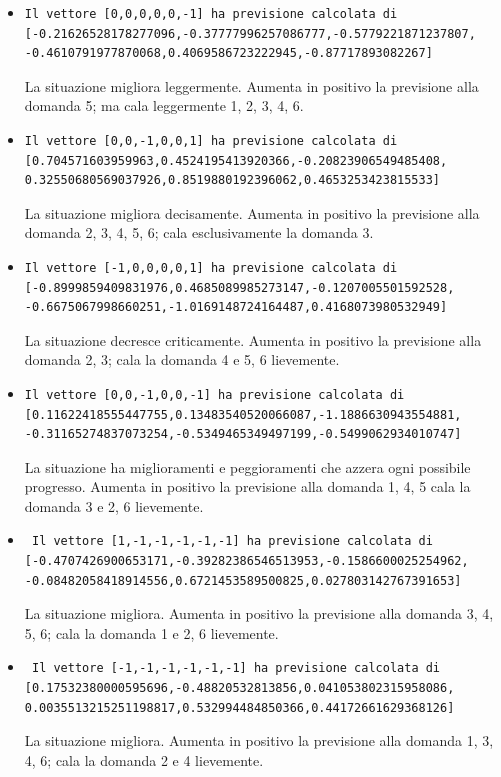 \begin{itemize}
\item \begin{verbatim}Il vettore [0,0,0,0,0,-1] ha previsione calcolata di
[-0.21626528178277096,-0.37777996257086777,-0.5779221871237807,
-0.4610791977870068,0.4069586723222945,-0.87717893082267]\end{verbatim}
La situazione migliora leggermente. Aumenta in positivo la previsione alla domanda 5; ma cala leggermente 1, 2, 3, 4, 6.

\item \begin{verbatim}Il vettore [0,0,-1,0,0,1] ha previsione calcolata di
[0.704571603959963,0.4524195413920366,-0.20823906549485408,
0.32550680569037926,0.8519880192396062,0.4653253423815533]
\end{verbatim}
La situazione migliora decisamente. Aumenta in positivo la previsione alla domanda 2, 3, 4, 5, 6;  cala esclusivamente la domanda 3.

\item \begin{verbatim}Il vettore [-1,0,0,0,0,1] ha previsione calcolata di
[-0.8999859409831976,0.4685089985273147,-0.1207005501592528,
-0.6675067998660251,-1.0169148724164487,0.4168073980532949]
\end{verbatim}
La situazione decresce criticamente. Aumenta in positivo la previsione alla domanda 2, 3; cala la domanda 4 e 5, 6 lievemente.

\item \begin{verbatim}Il vettore [0,0,-1,0,0,-1] ha previsione calcolata di
[0.11622418555447755,0.13483540520066087,-1.1886630943554881,
-0.31165274837073254,-0.5349465349497199,-0.5499062934010747]
\end{verbatim}
La situazione ha miglioramenti e peggioramenti che azzera ogni possibile progresso. Aumenta in positivo la previsione alla domanda 1, 4, 5  cala la domanda  3 e 2, 6 lievemente.

\item \begin{verbatim} Il vettore [1,-1,-1,-1,-1,-1] ha previsione calcolata di
[-0.4707426900653171,-0.39282386546513953,-0.1586600025254962,
-0.08482058418914556,0.6721453589500825,0.027803142767391653]
\end{verbatim}
La situazione migliora. Aumenta in positivo la previsione alla domanda 3, 4, 5, 6;  cala la domanda 1 e 2, 6 lievemente.

\item \begin{verbatim} Il vettore [-1,-1,-1,-1,-1,-1] ha previsione calcolata di
[0.17532380000595696,-0.48820532813856,0.041053802315958086,
0.0035513215251198817,0.532994484850366,0.44172661629368126]
\end{verbatim}
La situazione migliora. Aumenta in positivo la previsione alla domanda 1, 3, 4, 6;  cala la domanda 2 e 4 lievemente.

\end{itemize} 
